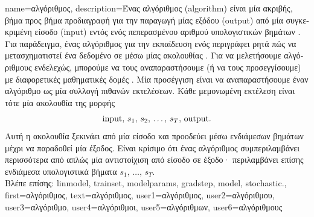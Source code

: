 {name={\foreignlanguage{greek}{αλγόριθμος}},
 	description={\foreignlanguage{greek}{Ένας} 
		\foreignlanguage{greek}{αλγόριθμος} (algorithm) \foreignlanguage{greek}{είναι μία ακριβής, βήμα προς βήμα προδιαγραφή για την  
		παραγωγή μίας εξόδου} (output) \foreignlanguage{greek}{από μία συγκεκριμένη είσοδο} (input) \foreignlanguage{greek}{εντός ενός πεπερασμένου 
		αριθμού υπολογιστικών βημάτων} \cite{Cormen:2022aa}. \foreignlanguage{greek}{Για παράδειγμα, ένας αλγόριθμος για την εκπαίδευση ενός} 
		 \foreignlanguage{greek}{περιγράφει ρητά πώς να μετασχηματιστεί ένα δεδομένο}  
		\foreignlanguage{greek}{σε}  \foreignlanguage{greek}{μέσω μίας ακολουθίας} 
		. \foreignlanguage{greek}{Για να μελετήσουμε αλγόριθμους ενδελεχώς, μπορούμε να τους αναπαραστήσουμε 
		(ή να τους προσεγγίσουμε) με διαφορετικές μαθηματικές δομές} \cite{Sipser2013}. \foreignlanguage{greek}{Μία προσέγγιση είναι να 
		αναπαραστήσουμε έναν αλγόριθμο ως μία συλλογή πιθανών εκτελέσεων. Κάθε μεμονωμένη εκτέλεση είναι τότε μία ακολουθία της  
		μορφής $${\rm input}, \,s_1, \,s_2, \,\ldots, \,s_T, \,{\rm output}.$$ Αυτή η ακολουθία ξεκινάει από μία είσοδο και προοδεύει μέσω ενδιάμεσων βημάτων 
		μέχρι να παραδοθεί μία έξοδος. Είναι κρίσιμο ότι ένας αλγόριθμος συμπεριλαμβάνει περισσότερα από απλώς μία αντιστοίχιση από είσοδο 
		σε έξοδο· περιλαμβάνει επίσης ενδιάμεσα υπολογιστικά βήματα} $s_1, \,\ldots, \,s_T$.\\
		\foreignlanguage{greek}{Βλέπε επίσης:} \gls{linmodel}, \gls{trainset}, \gls{modelparams}, \gls{gradstep}, \gls{model}, \gls{stochastic}.},
	first={\foreignlanguage{greek}{αλγόριθμος}},
	text={\foreignlanguage{greek}{αλγόριθμος}},
	user1={\foreignlanguage{greek}{αλγόριθμος}}, %
	user2={\foreignlanguage{greek}{αλγόριθμου}}, %
	user3={\foreignlanguage{greek}{αλγόριθμο}}, %
	user4={\foreignlanguage{greek}{αλγόριθμοι}}, %
	user5={\foreignlanguage{greek}{αλγόριθμων}}, %
	user6={\foreignlanguage{greek}{αλγόριθμους}} %
}

